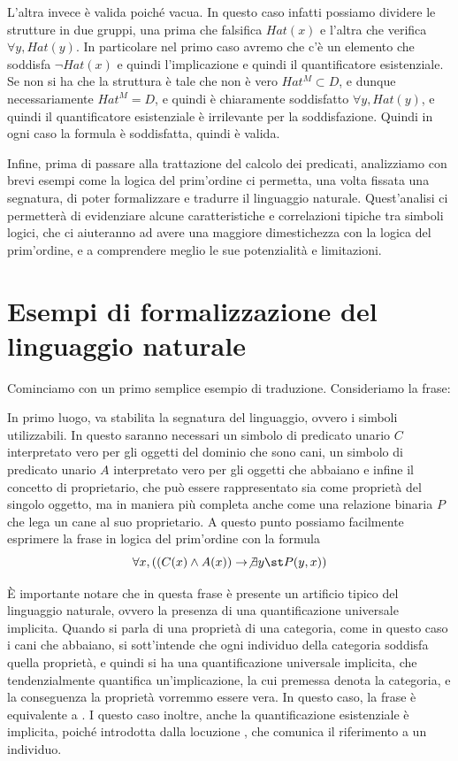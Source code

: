 L'altra invece è valida poiché vacua. In questo caso infatti possiamo dividere le strutture in due gruppi, una prima che falsifica \(Hat(x)\) e l'altra che verifica \(\forall y, Hat(y)\). In particolare nel primo caso avremo che c'è un elemento che soddisfa \(\neg Hat(x)\) e quindi l'implicazione e quindi il quantificatore esistenziale. Se non si ha che la struttura è tale che non è vero \(Hat^M \subset D\), e dunque necessariamente \(Hat^M = D\), e quindi è chiaramente soddisfatto \(\forall y, Hat(y)\), e quindi il quantificatore esistenziale è irrilevante per la soddisfazione. Quindi in ogni caso la formula è soddisfatta, quindi è valida.

Infine, prima di passare alla trattazione del calcolo dei predicati, analizziamo con brevi esempi come la logica del prim'ordine ci permetta, una volta fissata una segnatura, di poter formalizzare e tradurre il linguaggio naturale. Quest'analisi ci permetterà di evidenziare alcune caratteristiche e correlazioni tipiche tra simboli logici, che ci aiuteranno ad avere una maggiore dimestichezza con la logica del prim'ordine, e a comprendere meglio le sue potenzialità e limitazioni.

\section{Esempi di formalizzazione del linguaggio naturale}

Cominciamo con un primo semplice esempio di traduzione. Consideriamo la frase:

\begin{quote}
\end{quote}

In primo luogo, va stabilita la segnatura del linguaggio, ovvero i simboli utilizzabili. In questo saranno necessari un simbolo di predicato unario \(C\) interpretato vero per gli oggetti del dominio che sono cani, un simbolo di predicato unario \(A\) interpretato vero per gli oggetti che abbaiano e infine il concetto di proprietario, che può essere rappresentato sia come proprietà del singolo oggetto, ma in maniera più completa anche come una relazione binaria \(P\) che lega un cane al suo proprietario.
A questo punto possiamo facilmente esprimere la frase in logica del prim'ordine con la formula
\[\forall x, ((C(x) \land A(x)) \to \not\exists y\st P(y,x))\]

È importante notare che in questa frase è presente un artificio tipico del linguaggio naturale, ovvero la presenza di una quantificazione universale implicita. Quando si parla di una proprietà di una categoria, come in questo caso i cani che abbaiano, si sott'intende che ogni individuo della categoria soddisfa quella proprietà, e quindi si ha una quantificazione universale implicita, che tendenzialmente quantifica un'implicazione, la cui premessa denota la categoria, e la conseguenza la proprietà vorremmo essere vera. In questo caso, la frase  è equivalente a . I questo caso inoltre, anche la quantificazione esistenziale è implicita, poiché introdotta dalla locuzione , che comunica il riferimento a un individuo.

